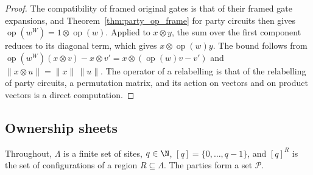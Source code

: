 \begin{proof}\leanok
    The compatibility of framed original gates is that of their framed gate expansions, and
    Theorem~\ref{thm:party_op_frame} for party circuits then gives
    $\operatorname{op}(w^W)=1\otimes\operatorname{op}(w)$. Applied to $x\otimes y$, the sum over
    the first component reduces to its diagonal term, which gives
    $x\otimes\operatorname{op}(w)y$. The bound follows from
    $\operatorname{op}(w^W)(x\otimes v)-x\otimes v'=x\otimes(\operatorname{op}(w)v-v')$ and
    $\lVert x\otimes u\rVert=\lVert x\rVert\,\lVert u\rVert$. The operator of a relabelling is that
    of the relabelling of party circuits, a permutation matrix, and its action on vectors and on
    product vectors is a direct computation.
\end{proof}

\subsection{Ownership sheets}

Throughout, $\Lambda$ is a finite set of sites, $q\in\N$, $[q]=\{0,\dots,q-1\}$, and
$[q]^R$ is the set of configurations of a region $R\subseteq\Lambda$. The parties form a set
$\mathcal P$.

